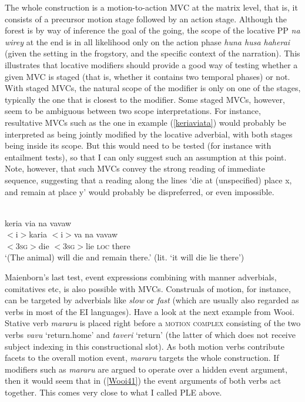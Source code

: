The whole construction is a motion-to-action MVC at the matrix level, that is, it consists of a precursor motion stage followed by an action stage. Although the forest is by way of inference the goal of the going, the scope of the locative PP \textit{na wirey} at the end is in all likelihood only on the action phase \textit{huna husa haherai} (given the setting in the frogstory, and the specific context of the narration). This illustrates that locative modifiers should provide a good way of testing whether a given MVC is staged (that is, whether it contains two temporal phases) or not. With staged MVCs, the natural scope of the modifier is only on one of the stages, typically the one that is closest to the modifier. Some staged MVCs, however, seem to be ambiguous between two scope interpretations. For instance, resultative MVCs such as the one in example (\ref{keriaviata}) would probably be interpreted as being jointly modified by the locative adverbial, with both stages being inside its scope. But this would need to be tested (for instance with entailment tests), so that I can only suggest such an assumption at this point. Note, however, that such MVCs convey the strong reading of immediate sequence, suggesting that a reading along the lines `die at (unspecified) place x, and remain at place y' would probably be dispreferred, or even impossible.

\ea \label{keriaviata} 
\\
\glll keria via na vavaw \\
$<$i$>$karia $<$i$>$va na vavaw \\
$<$3\textsc{sg}$>$die $<$3\textsc{sg}$>$lie \textsc{loc} there\\
\glft `(The animal) will die and remain there.' (lit. `it will die lie there')\\ 
\z

Maienborn's last test, event expressions combining with manner adverbials, comitatives etc, is also possible with MVCs. Construals of motion, for instance, can be targeted by adverbials like \textit{slow} or \textit{fast} (which are usually also regarded as verbs in most of the EI languages). Have a look at the next example from Wooi. Stative verb \textit{mararu} is placed right before a \textsc{motion complex} consisting of the two verbs \textit{vavu} `return.home' and \textit{taveri} `return' (the latter of which does not receive subject indexing in this constructional slot). As both motion verbs contribute facets to the overall motion event, \textit{mararu} targets the whole construction. If modifiers such as \textit{mararu} are argued to operate over a hidden event argument, then it would seem that in (\ref{Wooi41}) the event arguments of both verbs act together. This comes very close to what I called PLE above.

